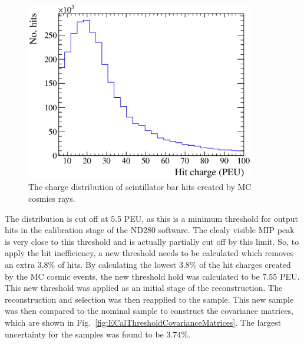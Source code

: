 \begin{figure}
  \centering
  \includegraphics[width=10cm]{images/measurement/systematics/detector/threshold/hit_charge_cosmic_MC_PEU.eps}
  \caption{The charge distribution of scintillator bar hits created by MC cosmics rays.}
  \label{fig:HitChargeCosmicMCPEU}
\end{figure}
The distribution is cut off at 5.5 PEU, as this is a minimum threshold for output hits in the calibration stage of the ND280 software.  The clealy visible MIP peak is very close to this threshold and is actually partially cut off by this limit.  So, to apply the hit inefficiency, a new threshold needs to be calculated which removes an extra 3.8$\%$ of hits.  By calculating the lowest 3.8$\%$ of the hit charges created by the MC cosmic events, the new threshold hold was calculated to be 7.55 PEU.  This new threshold was applied as an initial stage of the reconstruction.  The reconstruction and selection was then reapplied to the sample.  This new sample was then compared to the nominal sample to construct the covariance matrices, which are shown in Fig.~\ref{fig:ECalThresholdCovarianceMatrices}.  The largest uncertainty for the samples was found to be 3.74$\%$.
